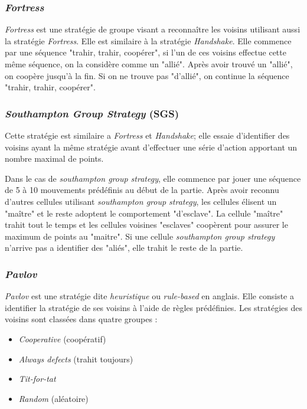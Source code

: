 \documentclass[a4paper]{article}
\begin{document}
\subsubsection{\textit{Fortress}}
\textit{Fortress} est une stratégie de groupe visant a reconnaître les voisins utilisant aussi la stratégie \textit{Fortress}. Elle est similaire à la stratégie \textit{Handshake}. Elle commence par une séquence "trahir, trahir, coopérer", si l'un de ces voisins effectue cette même séquence, on la considère comme un "allié". Après avoir trouvé un "allié", on coopère jusqu'à la fin. Si on ne trouve pas "d'allié", on continue la séquence "trahir, trahir, coopérer".

\subsubsection{\textit{Southampton Group Strategy} (SGS)}
Cette stratégie est similaire a \textit{Fortress} et \textit{Handshake}; elle essaie d'identifier des voisins ayant la même stratégie avant d'effectuer une série d'action apportant un nombre maximal de points. 

Dans le cas de \textit{southampton group strategy}, elle commence par jouer une séquence de 5 à 10 mouvements prédéfinis au début de la partie. Après avoir reconnu d'autres cellules utilisant \textit{southampton group strategy}, les cellules élisent un "maître" et le reste adoptent le comportement "d'esclave". La cellule "maître" trahit tout le temps et les cellules voisines "esclaves" coopèrent pour assurer le maximum de points au "maitre". Si une cellule \textit{southampton group strategy} n'arrive pas a identifier des "aliés", elle trahit le reste de la partie.

\subsubsection{\textit{Pavlov}}
\textit{Pavlov} est une stratégie dite \textit{heuristique} ou \textit{rule-based} en anglais. Elle consiste a identifier la stratégie de ses voisins à l'aide de règles prédéfinies. Les stratégies des voisins sont classées dans quatre groupes :
\begin{itemize}
    \item \textit{Cooperative} (coopératif)
    \item \textit{Always defects} (trahit toujours)
    \item \textit{Tit-for-tat}
    \item \textit{Random} (aléatoire)
\end{itemize}
\end{document}
